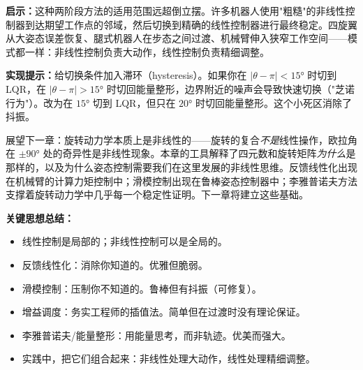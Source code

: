 \begin{mdframed}[linewidth=1pt, innertopmargin=10pt, innerbottommargin=10pt]
\textbf{启示：}这种两阶段方法的适用范围远超倒立摆。许多机器人使用"粗糙"的非线性控制器到达期望工作点的邻域，然后切换到精确的线性控制器进行最终稳定。四旋翼从大姿态误差恢复、腿式机器人在步态之间过渡、机械臂伸入狭窄工作空间——模式都一样：非线性控制负责大动作，线性控制负责精细调整。

\textbf{实现提示：}给切换条件加入滞环（hysteresis）。如果你在 $|\theta - \pi| < 15°$ 时切到 LQR，在 $|\theta - \pi| > 15°$ 时切回能量整形，边界附近的噪声会导致快速切换（"芝诺行为"）。改为在 $15°$ 切到 LQR，但只在 $20°$ 时切回能量整形。这个小死区消除了抖振。
\end{mdframed}

\vspace{1em}

展望下一章：旋转动力学本质上是非线性的——旋转的复合\textit{不是}线性操作，欧拉角在 $\pm 90°$ 处的奇异性是非线性现象。本章的工具解释了四元数和旋转矩阵\textit{为什么}是那样的，以及为什么姿态控制需要我们在这里发展的非线性思维。反馈线性化出现在机械臂的计算力矩控制中；滑模控制出现在鲁棒姿态控制器中；李雅普诺夫方法支撑着旋转动力学中几乎每一个稳定性证明。下一章将建立这些基础。

\textbf{关键思想总结：}
\begin{itemize}[nosep]
    \item 线性控制是局部的；非线性控制可以是全局的。
    \item 反馈线性化：消除你知道的。优雅但脆弱。
    \item 滑模控制：压制你不知道的。鲁棒但有抖振（可修复）。
    \item 增益调度：务实工程师的插值法。简单但在过渡时没有理论保证。
    \item 李雅普诺夫/能量整形：用能量思考，而非轨迹。优美而强大。
    \item 实践中，把它们组合起来：非线性处理大动作，线性处理精细调整。
\end{itemize}
